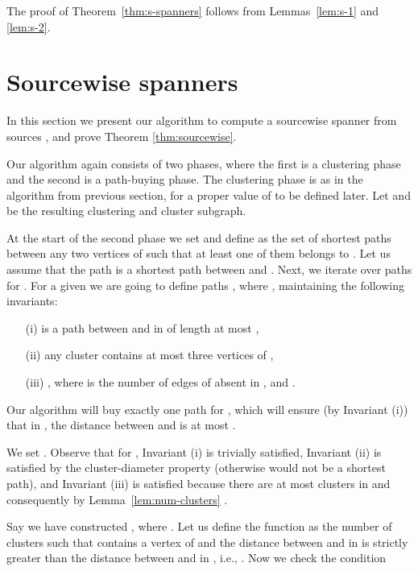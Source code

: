 \documentclass[a4paper,11pt]{article}
\theoremstyle{definition}
\begin{document}
The proof of Theorem~\ref{thm:s-spanners} follows from Lemmas~\ref{lem:s-1} and \ref{lem:s-2}.



\section{Sourcewise spanners}
\label{section-sourcewise}

In this section we present our algorithm to compute a sourcewise spanner from sources , and prove Theorem \ref{thm:sourcewise}. 

Our algorithm again consists of two phases, where the first 
is a clustering phase and the second is a path-buying phase.
The clustering phase is as in the algorithm from previous section, for a proper value of  to be defined later. Let  and  be the resulting clustering and cluster subgraph. 


At the start of the second phase we set 
and define  as the 
set of shortest paths between any two vertices of 
such that at least one of them belongs to .
Let us assume that the path  is a shortest path 
between  and .
Next, we iterate over paths  for .
For a given  we are going to define paths , where ,
maintaining the following invariants:\smallskip

\begin{itemize}
  \item[(i)]  is a path between  and  in  of length at most ,
  \item[(ii)] any cluster  contains at most three vertices of ,
  \item[(iii)] , where  is the number of edges of  absent in ,
and .
\end{itemize}

\smallskip\noindent Our algorithm will buy exactly one path  for , which will ensure 
(by Invariant (i)) that in , the distance between  and  is at most .

We set . 
Observe that for , Invariant (i) is trivially satisfied,
Invariant (ii) is satisfied by the cluster-diameter property  
(otherwise  would not be a shortest path),
and Invariant (iii) is satisfied because there are at most  clusters in 
and consequently by Lemma~\ref{lem:num-clusters} . 

Say we have constructed , where .
Let us define the function  as the number of clusters  
such that  contains a vertex of  and the distance
between  and  in  is strictly greater than
the distance between  and  in , i.e., .
Now we check the condition 
 
\end{document}
